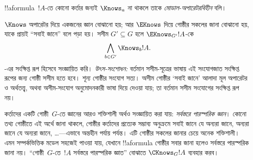 \documentclass[../../../include/open-logic-section]{subfiles}
\begin{document}
!!a{formula}~$!A$-তে কোনো কর্তার জন্যই $\Knows_a$ না থাকলে তাকে \emph{মোডাল-অপারেটরবিহীন} বলি।

\begin{defn}
  $\Knows$ অপারেটর দিয়ে একজনের জ্ঞান বোঝানো হয়; আর $\EKnows$ দিয়ে গোষ্ঠীর সকলের জানা বোঝানো হয়, যাকে প্রায়ই ``সবাই জানে'' বলে পড়া হয়। সসীম $G' \subseteq G$ হলে $\EKnows_{G'} !A$-কে \[\bigwedge_{b \in G'} \Knows_b !A.\]-এর সংক্ষিপ্ত রূপ হিসেবে সংজ্ঞায়িত করি।
\emph{উৎস-সংশোধন:} বর্তমান সসীম-সূত্রের ভাষায় এই সংযোগজাত সংক্ষিপ্ত রূপের জন্য গোষ্ঠী সসীম হতে হবে। শূন্য গোষ্ঠীর সংযোগ সত্য। অসীম গোষ্ঠীর ‘সবাই জানে’ আলাদা মূল অপারেটর ও অর্থতত্ত্ব, অথবা অসীম-সংযোগ অনুমোদনকারী ভাষা দিয়ে দেওয়া যায়; তা বর্তমান সসীম সংযোগের সংক্ষিপ্ত রূপ নয়।
\end{defn}

কর্তাদের একটি গোষ্ঠী~$G$-তে জ্ঞানের আরও শক্তিশালী অর্থও সংজ্ঞায়িত করা যায়: \emph{সর্বস্তরে পারস্পরিক জ্ঞান}। কোনো তথ্য গোষ্ঠীতে এই অর্থে জানা থাকলে, গোষ্ঠীর কর্তাদের প্রত্যেক সম্ভাব্য অনুক্রমে সবাই জানে যে অন্যরা জানে, অন্যরা জানে যে অন্যরা জানে, \dots—এভাবে অন্তহীন পর্যায় পর্যন্ত। এটি গোষ্ঠীর সকলের জানার চেয়ে অনেক শক্তিশালী। এমন সম্পর্কভিত্তিক মডেল সহজেই পাওয়া যায়, যেখানে !!a{formula} গোষ্ঠীর সবার জানা হলেও সর্বস্তরে পারস্পরিক জানা নয়। ``গোষ্ঠী~$G$-তে~$!A$ সর্বস্তরে পারস্পরিক জ্ঞাত'' বোঝাতে $\CKnows_G !A$ ব্যবহার করব।
\end{document}
